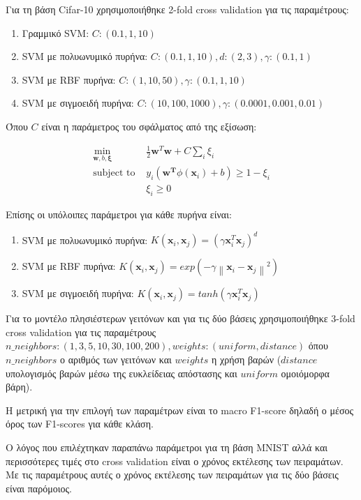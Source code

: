 \documentclass[a4paper]{article}
\newcommand{\norm}[1]{\left\lVert#1\right\rVert}
\begin{document}
Για τη βάση Cifar-10 χρησιμοποιήθηκε 2-fold cross validation για τις
παραμέτρους:

\begin{enumerate}
    \item Γραμμικό SVM: $C: (0.1, 1, 10)$
    \item SVM με πολυωνυμικό πυρήνα: $C: (0.1, 1, 10), d: (2, 3), \gamma:
        (0.1, 1)$
    \item SVM με RBF πυρήνα: $C: (1, 10, 50), \gamma: (0.1, 1, 10)$
    \item SVM με σιγμοειδή πυρήνα: $C: (10, 100, 1000), \gamma: (0.0001, 0.001,
        0.01)$
\end{enumerate}

Όπου $C$ είναι η παράμετρος του σφάλματος από της εξίσωση:

\begin{equation*}
\begin{split}
    \min_{\bm{w},b,\bm{\xi}} & \frac{1}{2} \bm{w}^T\bm{w} + C \sum_{i} \xi_{i} \\
    \text{subject to } & y_i (\bm{w^T} \phi (\bm{x}_i) + b) \ge 1 - \xi_i \\
     & \xi_i \ge 0
\end{split}
\end{equation*}

Επίσης οι υπόλοιπες παράμετροι για κάθε πυρήνα είναι:

\begin{enumerate}
    \item SVM με πολυωνυμικό πυρήνα: $K(\bm{x}_i,\bm{x}_j) = (\gamma \bm{x}_i^T
        \bm{x}_j)^d$
    \item SVM με RBF πυρήνα: $K(\bm{x}_i,\bm{x}_j) = exp(-\gamma
        \norm{\bm{x}_i - \bm{x}_j}^2)$
    \item SVM με σιγμοειδή πυρήνα: $K(\bm{x}_i,\bm{x}_j) = tanh(\gamma
        \bm{x}_i^T \bm{x}_j)$
\end{enumerate}

Για το μοντέλο πλησιέστερων γειτόνων και για τις δύο βάσεις χρησιμοποιήθηκε
3-fold cross validation για τις παραμέτρους $n\_neighbors: (1, 3, 5, 10, 30,
100, 200), weights: (uniform, distance)$ όπου $n\_neighbors$ ο αριθμός των
γειτόνων και $weights$ η χρήση βαρών ($distance$ υπολογισμός βαρών μέσω της
ευκλείδειας απόστασης και $uniform$ ομοιόμορφα βάρη).

Η μετρική για την επιλογή των παραμέτρων είναι το macro F1-score δηλαδή ο μέσος
όρος των F1-scores για κάθε κλάση.

Ο λόγος που επιλέχτηκαν παραπάνω παράμετροι για τη βάση MNIST αλλά και
περισσότερες τιμές στο cross validation είναι ο χρόνος εκτέλεσης των πειραμάτων.
Με τις παραμέτρους αυτές ο χρόνος εκτέλεσης των πειραμάτων για τις δύο βάσεις
είναι παρόμοιος.
\end{document}
